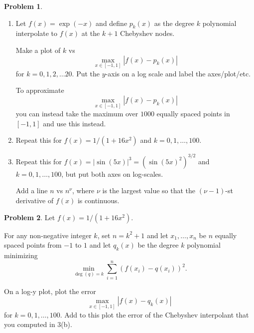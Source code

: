 \documentclass[12pt]{article}
\theoremstyle{definition}
\newtheorem{problem}{Problem}
\begin{document}
\begin{problem}
    \begin{enumerate}
        \item 
    Let $f(x) = \exp(-x)$ and define $p_k(x)$ as the degree $k$ polynomial interpolate to $f(x)$ at the $k+1$ Chebyshev nodes. 

    Make a plot of $k$ vs 
    \[
        \max_{x\in[-1,1]} |f(x) - p_k(x)|
    \]
    for $k=0,1,2,\ldots20$. Put the $y$-axis on a log scale and label the axes/plot/etc.

    To approximate \[
        \max_{x\in[-1,1]} |f(x) - p_k(x)|
    \]
    you can instead take the maximum over $1000$ equally spaced points in $[-1,1]$ and use this instead. 

\item Repeat this for $f(x) = 1/(1+16x^2)$ and $k=0,1,\ldots, 100$.

\item Repeat this for $f(x) = |\sin(5x)|^3 = (\sin(5x)^2)^{3/2}$ and $k=0,1,\ldots,100$, but put both axes on log-scales.

    Add a line $n$ vs $n^\nu$, where $\nu$ is the largest value so that the $(\nu-1)$-st derivative of $f(x)$ is continuous.
\end{enumerate}

\end{problem}

\begin{problem}
    Let $f(x) = 1/(1+16x^2)$.

    For any non-negative integer $k$, set $n=k^2+1$ and let $x_1 ,\ldots, x_n$ be $n$ equally spaced points from $-1$ to $1$ and let $q_{k}(x)$ be the degree $k$ polynomial minimizing
    \[
        \min_{\deg(q) = k} \sum_{i=1}^{n} ( f(x_i) - q(x_i) )^2.
    \]

    On a log-y plot, plot the error
    \[
        \max_{x\in[-1,1]} |f(x) - q_{k}(x)|
    \]
    for $k=0,1,\ldots, 100$.
    Add to this plot the error of the Chebyshev interpolant that you computed in 3(b).



\end{problem}
\end{document}

